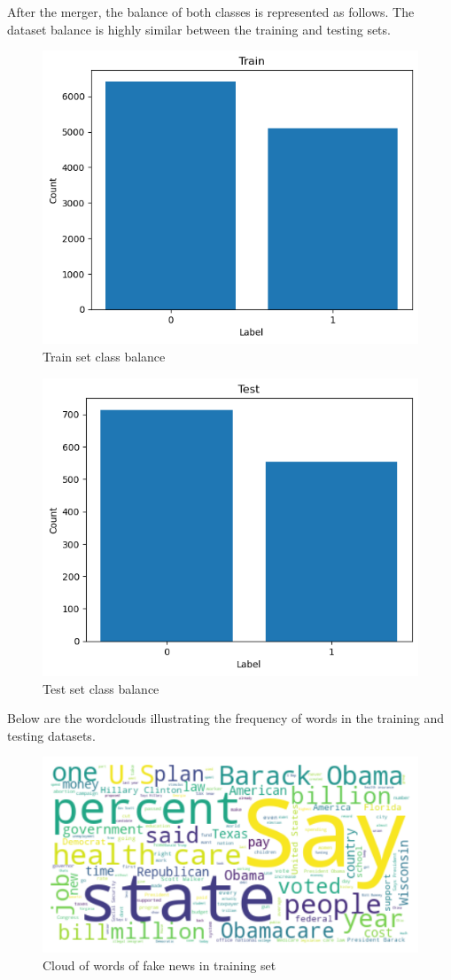 After the merger, the balance of both classes is represented as follows. The dataset balance is highly similar between the training and testing sets.

\begin{figure}[H]
\centering
\includegraphics[width=0.7\linewidth]{train_balance.png}
\caption{Train set class balance}
\label{train_balance}
\end{figure}

\begin{figure}[H]
\centering
\includegraphics[width=0.7\linewidth]{test_balance.png}
\caption{Test set class balance}
\label{test_balance}
\end{figure}

Below are the wordclouds illustrating the frequency of words in the training and testing datasets.

\begin{figure}[H]
\centering
\includegraphics[width=0.7\linewidth]{wordcloud_train_fake.png}
\caption{Cloud of words of fake news in training set}
\label{wordcloud_train_fake}
\end{figure}

